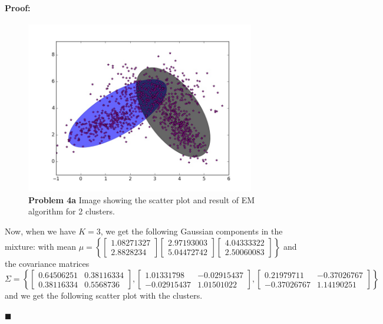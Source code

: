 \documentclass[12pt]{article}
\newenvironment{proof}{\paragraph{Proof: }}{\hfill$\blacksquare$}
\begin{document}
\begin{proof}
\begin{enumerate}
\begin{figure}[!htbp]
\centering
\includegraphics[width = 10cm]{prob4a_k2.jpg}
\caption{\textbf{Problem 4a} Image showing the scatter plot and result of EM algorithm for 2 clusters.}
\end{figure}

Now, when we have $K = 3$, we get the following Gaussian components in the mixture: with mean $\mu = \left\{ \left[ \begin{matrix} 1.08271327 \\ 2.8828234 \end{matrix} \right] \left[ \begin{matrix} 2.97193003 \\ 5.04472742 \end{matrix}\right] \left[ \begin{matrix} 4.04333322 \\ 2.50060083 \end{matrix}\right] \right\}$ and the covariance matrices $\Sigma = \left\{ \left[ \begin{matrix} 0.64506251 & 0.38116334 \\ 0.38116334 & 0.5568736\end{matrix} \right], \left[ \begin{matrix} 1.01331798 & -0.02915437 \\ -0.02915437 & 1.01501022 \end{matrix} \right], \left[ \begin{matrix} 0.21979711 &-0.37026767 \\ -0.37026767 & 1.14190251 \end{matrix} \right] \right\}$ and we get the following scatter plot with the clusters. \\


\end{enumerate}
\end{proof}
\end{document}
